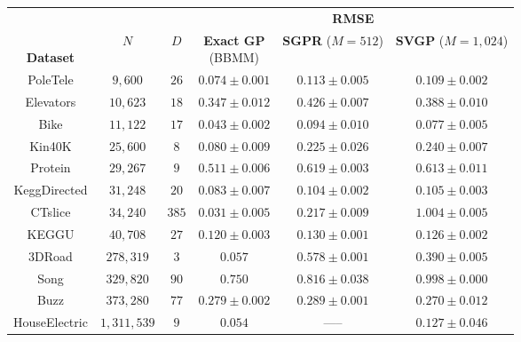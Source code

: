 \begin{tabular}{ cccccc }
  \toprule
  &&&
	\multicolumn{3}{c}{{\bf RMSE}}  \\
  \cmidrule{4-6}
  \thead{\\{\bf Dataset}} & \thead{\\$N$} & \thead{\\$D$} &
  \thead{{\bf Exact GP} \\ (BBMM)} & \thead{{\bf SGPR} \\ ($M\!=\!512$)} & \thead{{\bf SVGP} \\ ($M\!=\!1,\!024$)}
  \\
  \midrule
	PoleTele             & $9,\!600$          & $26$  &   $\mathbf{0.074}\pm 0.001$           & $0.113\pm 0.005$ & $0.109\pm 0.002$          \\
	Elevators            & $10,\!623$         & $18$  &   $\mathbf{0.347}\pm 0.012$           & $0.426\pm 0.007$ & $0.388\pm 0.010$ \\
	Bike                 & $11,\!122$         & $17$  &   $\mathbf{0.043}\pm 0.002$           & $0.094\pm 0.010$ & $0.077\pm 0.005$          \\
	Kin40K               & $25,\!600$         & $8$   &   $\mathbf{0.080}\pm 0.009$           & $0.225\pm 0.026$ & $0.240\pm 0.007$          \\
	Protein              & $29,\!267$         & $9$   &   $\mathbf{0.511}\pm 0.006$           & $0.619\pm 0.003$ & $0.613\pm 0.011$          \\
	KeggDirected         & $31,\!248$         & $20$  &   $\mathbf{0.083}\pm 0.007$           & $0.104\pm 0.002$ & $0.105\pm 0.003$          \\
	CTslice              & $34,\!240$         & $385$ &   $\mathbf{0.031}\pm 0.005$           & $0.217\pm 0.009$ & $1.004\pm 0.005$ \\
	KEGGU                & $40,\!708$         & $27$  &   $\mathbf{0.120}\pm 0.003$           & $0.130\pm 0.001$ & $0.126\pm 0.002$          \\
	3DRoad               & $278,\!319$        & $3$   &   $\mathbf{0.057}$                    & $0.578\pm 0.001$ & $0.390\pm 0.005$          \\
	Song                 & $329,\!820$        & $90$  &   $\mathbf{0.750}$                    & $0.816\pm 0.038$ & $0.998\pm 0.000$          \\
  Buzz                 & $373,\!280$        & $77$  &   $0.279\pm 0.002$                    & $0.289\pm 0.001$ & $\mathbf{0.270}\pm 0.012$ \\
	HouseElectric        & $1,\!311,\!539$    & $9$   &   $\mathbf{0.054}$                    & -----            & $0.127\pm 0.046$          \\
  \bottomrule
\end{tabular}

